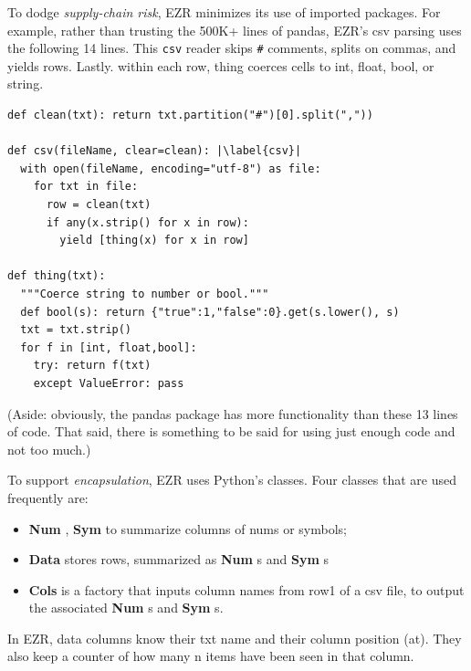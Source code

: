 \documentclass[AMA,STIX2COL]{WileyNJDv5}
\newcommand{\cls}[1]{%
  \setlength{\fboxsep}{1.5pt}%
  \colorbox{clsbg}{\sffamily\bfseries{#1}}%
}
\begin{document}
To dodge {\em supply-chain risk}, EZR minimizes its use of imported packages.
For example, rather than     trusting the 500K+ lines of pandas, EZR's
csv parsing uses the following 14 lines. This \texttt{csv} reader skips \texttt{\#} comments, splits on commas, and yields rows. Lastly. within each row, \textsf{thing} coerces cells to int, float, bool, or string.
\begin{verbatim}
def clean(txt): return txt.partition("#")[0].split(","))

def csv(fileName, clear=clean): |\label{csv}|
  with open(fileName, encoding="utf-8") as file:
    for txt in file:
      row = clean(txt)
      if any(x.strip() for x in row):
        yield [thing(x) for x in row]

def thing(txt):
  """Coerce string to number or bool."""
  def bool(s): return {"true":1,"false":0}.get(s.lower(), s)
  txt = txt.strip() 
  for f in [int, float,bool]:
    try: return f(txt)
    except ValueError: pass
\end{verbatim}
(Aside: obviously, the pandas package has more functionality
than these  13 lines of code. That said,  there is something to be said for using just enough code and
not too much.)




To support {\em encapsulation}, EZR uses Python's classes. Four classes
that are used   frequently are:
\begin{itemize}
\item \cls{Num},\cls{Sym} to summarize columns of nums  or symbols;
\item \cls{Data}   stores rows, summarized as \cls{Num}s and  \cls{Sym}s
\item \cls{Cols} is a factory that inputs   column names from row1 of a csv file, to output the associated \cls{Num}s and \cls{Sym}s.
\end{itemize}
In EZR, data columns know their \textsf{txt} name and their column position (\textsf{at}).
They also keep a counter of how many \textsf{n}  items have been seen in that column.
\end{document}

